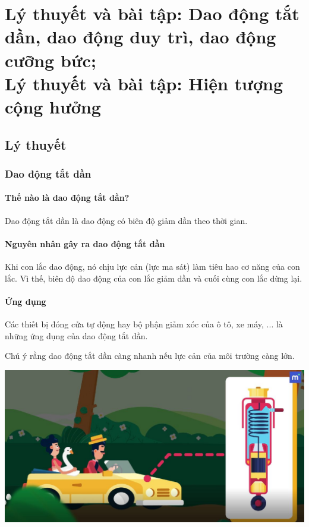 
\chapter[Lý thuyết và bài tập: Dao động tắt dần, dao động duy trì, dao động cưỡng bức;\\Lý thuyết và bài tập: Hiện tượng cộng hưởng]{Lý thuyết và bài tập: Dao động tắt dần, dao động duy trì, dao động cưỡng bức;\\Lý thuyết và bài tập: Hiện tượng cộng hưởng}
\section{Lý thuyết}
\subsection{Dao động tắt dần}
\subsubsection{Thế nào là dao động tắt dần?}
Dao động tắt dần là dao động có biên độ giảm dần theo thời gian.
\subsubsection{Nguyên nhân gây ra dao động tắt dần}
Khi con lắc dao động, nó chịu lực cản (lực ma sát) làm tiêu hao cơ năng của con lắc. Vì thế, biên độ dao động của con lắc giảm dần và cuối cùng con lắc dừng lại.
\subsubsection{Ứng dụng}
Các thiết bị đóng cửa tự động hay bộ phận giảm xóc của ô tô, xe máy, ... là những ứng dụng của dao động tắt dần.

Chú ý rằng dao động tắt dần càng nhanh nếu lực cản của môi trường càng lớn.
\begin{center}
	\includegraphics[scale=0.5]{../figs/VN12-PH-05-L-004-1-V2-03}
\end{center}
